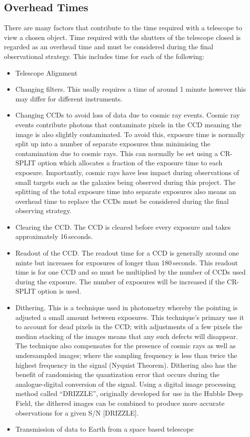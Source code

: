 	\subsection{Overhead Times} %
	\label{sub:overhead_times}
		There are many factors that contribute to the time required with a telescope to view a chosen object. Time required with the shutters of the telescope closed is regarded as an overhead time and must be considered during the final observational strategy. This includes time for each of the following\cite{Overhead_Times}:
		\begin{itemize}
			\item Telescope Alignment
			\item Changing filters. This usally requires a time of around 1 minute however this may differ for different instruments.
			\item Changing CCDs to avoid loss of data due to cosmic ray events. Cosmic ray events contribute photons that contaminate pixels in the CCD meaning the image is also slightly contaminated. To avoid this, exposure time is normally split up into a number of separate exposures thus minimising the contamination due to cosmic rays. This can normally be set using a CR-SPLIT option which allocates a fraction of the exposure time to each exposure\cite{Space_Telescope_Science_cosmic_ray}. Importantly, cosmic rays have less impact during observations of small targets such as the galaxies being observed during this project. The splitting of the total exposure time into separate exposures also means an overhead time to replace the CCDs must be considered during the final observing strategy.
			\item Clearing the CCD. The CCD is cleared before every exposure and takes approximately 16\,seconds.
			\item Readout of the CCD. The readout time for a CCD is generally around one minte but increases for exposures of longer than 180\,seconds. This readout time is for one CCD and so must be multiplied by the number of CCDs used  during the exposure. The number of exposures will be increased if the CR-SPLIT option is used.
			\item Dithering. This is a technique used in photometry whereby the pointing is adjusted a small amount between exposures. This technique's primary use it to account for dead pixels in the CCD; with adjustments of a few pixels the median stacking of the images means that any such defects will disappear. The technique also compensates for the presence of cosmic rays as well as undersampled images; where the sampling frequency is less than twice the highest frequency in the signal (Nyquist Theorem). Dithering also has the benefit of randomising the quantization error that occurs during the analogue-digital conversion of the signal\cite{ADC_Kamensky}. Using a digital image processing method called ``DRIZZLE'', originally developed for use in the Hubble Deep Field, the dithered images can be combined to produce more accurate observations for a given S/N [DRIZZLE].
			\item Transmission of data to Earth from a space based telescope
		\end{itemize}
